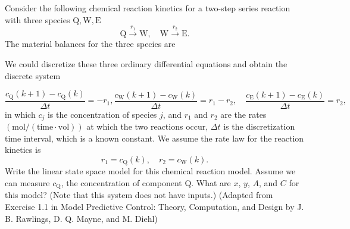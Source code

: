 Consider the following chemical reaction kinetics for a two-step series reaction with three species $\text{Q},\text{W},\text{E}$
\begin{equation*}
    \text{Q}\overset{r_1}{\rightarrow} \text{W}, \quad \text{W}\overset{r_2}{\rightarrow} \text{E}.
\end{equation*}
The material balances for the three species are
\begin{center}
\end{center}
We could discretize these three ordinary differential equations and obtain the discrete system

\begin{equation*}
    \frac{c_\text{Q}(k+1) - c_\text{Q}(k)}{\Delta t}= -r_1, \frac{c_\text{W}(k+1) - c_\text{W}(k)}{\Delta t} = r_1-r_2,\quad\frac{c_\text{E}(k+1) - c_\text{E}(k)}{\Delta t} = r_2,
\end{equation*}
in which $c_j$ is the concentration of species $j$, and $r_1$ and $r_2$ are the rates $(\text{mol}/(\text{time}\cdot \text{vol}))$ at which the two reactions occur, $\Delta t$ is the discretization time interval, which is a known constant. We assume the rate law for the reaction kinetics is
\begin{equation*}
    r_1 = c_\text{Q}(k),\quad r_2 = c_\text{W}(k).
\end{equation*}
Write the linear state space model for this chemical reaction model. Assume we can measure $c_{\text{Q}}$, the concentration of component Q. What are $x$, $y$, $A$, and $C$ for this model? (Note that this system does not have inputs.) (Adapted from Exercise 1.1 in Model Predictive Control: Theory, Computation, and Design by J. B. Rawlings, D. Q. Mayne, and M. Diehl)
